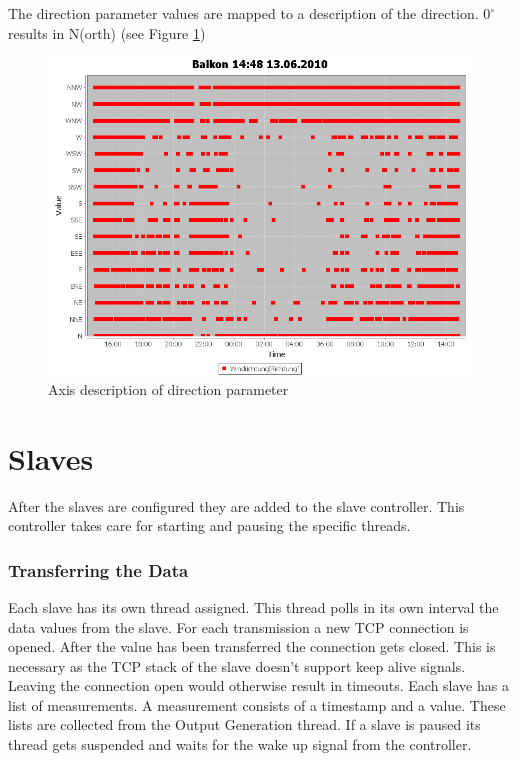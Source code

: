 The direction parameter values are mapped to a description of the direction. $0^\circ$ results in N(orth) (see Figure \ref{fig:dir})

\begin{figure}[ht]
    \centering
    \includegraphics[width=0.9\linewidth]{master/plot_dir.png}
    \caption{Axis description of direction parameter}
    \label{fig:dir}
\end{figure}

\section{Slaves} %
\label{sec:slaves}

After the slaves are configured they are added to the slave controller. This controller takes care for starting and pausing the specific threads. 

\subsubsection{Transferring the Data} %
\label{ssub:getting_the_data}
Each slave has its own thread assigned. This thread polls in its own interval the data values from the slave. For each transmission a new TCP connection is opened. After the value has been transferred the connection gets closed. This is necessary as the TCP stack of the slave doesn't support keep alive signals. Leaving the connection open would otherwise result in timeouts. Each slave has a list of measurements. A measurement consists of a timestamp and a value. These lists are collected from the Output Generation thread. If a slave is paused its thread gets suspended and waits for the wake up signal from the controller. 

